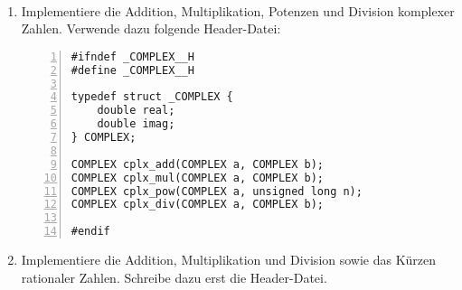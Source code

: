 \begin{aufg}
~\begin{enumerate}
\item
Implementiere die Addition, Multiplikation, Potenzen und Division komplexer Zahlen. Verwende dazu folgende Header-Datei:
\begin{codelisting}
\begin{lstlisting}[numbers=left,numberstyle=\tiny,frame=tlrb]
#ifndef _COMPLEX__H
#define _COMPLEX__H

typedef struct _COMPLEX {
	double real;
	double imag;
} COMPLEX;

COMPLEX cplx_add(COMPLEX a, COMPLEX b);
COMPLEX cplx_mul(COMPLEX a, COMPLEX b);
COMPLEX cplx_pow(COMPLEX a, unsigned long n);
COMPLEX cplx_div(COMPLEX a, COMPLEX b);

#endif
\end{lstlisting}
\end{codelisting}
\item Implementiere die Addition, Multiplikation und Division sowie das Kürzen rationaler Zahlen. Schreibe dazu erst die Header-Datei.
\end{enumerate}
\end{aufg}